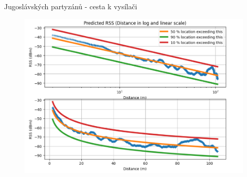 \documentclass[aspectratio=169, 12pt, hyperref={unicode}]{beamer}
\begin{document}
\begin{frame}{Jugoslávských partyzánů - cesta k vysílači}
	\begin{figure}[!ht]
		\centering
		\includegraphics[width=.6\textwidth]{src/partyzanu-k-vysilaci-3.png}
	\end{figure}
\end{frame}
\end{document}
